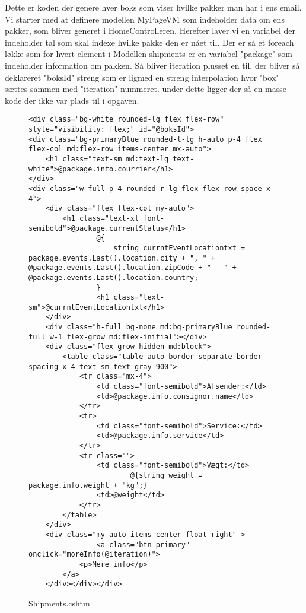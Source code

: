 Dette er koden der genere hver boks som viser hvilke pakker man har i ens email. Vi starter med at 
definere modellen MyPageVM som indeholder data om ens pakker, som bliver generet i HomeControlleren.
Herefter laver vi en variabel der indeholder tal som skal indexe hvilke pakke den er nået til. Der er så 
et foreach løkke som for hvert element i Modellen shipments er en variabel "package" som indeholder information
om pakken. Så bliver iteration plusset en til. der bliver så deklareret "boksId" streng som er ligmed en streng interpolation
hvor "box" sættes sammen med "iteration" nummeret. under dette ligger der så en masse kode der ikke var plads til i opgaven.
\newpage
\begin{figure}[!h]
    \begin{verbatim}
<div class="bg-white rounded-lg flex flex-row" style="visibility: flex;" id="@boksId">
<div class="bg-primaryBlue rounded-l-lg h-auto p-4 flex flex-col md:flex-row items-center mx-auto">
    <h1 class="text-sm md:text-lg text-white">@package.info.courrier</h1>
</div>
<div class="w-full p-4 rounded-r-lg flex flex-row space-x-4">
    <div class="flex flex-col my-auto">
        <h1 class="text-xl font-semibold">@package.currentStatus</h1>
                @{
                    string currntEventLocationtxt = package.events.Last().location.city + ", " + @package.events.Last().location.zipCode + " - " + @package.events.Last().location.country;
                }
                <h1 class="text-sm">@currntEventLocationtxt</h1>
    </div>
    <div class="h-full bg-none md:bg-primaryBlue rounded-full w-1 flex-grow md:flex-initial"></div>
    <div class="flex-grow hidden md:block">
        <table class="table-auto border-separate border-spacing-x-4 text-sm text-gray-900">
            <tr class="mx-4">
                <td class="font-semibold">Afsender:</td>
                <td>@package.info.consignor.name</td>
            </tr>
            <tr>
                <td class="font-semibold">Service:</td>
                <td>@package.info.service</td>
            </tr>
            <tr class="">
                <td class="font-semibold">Vægt:</td>
                        @{string weight = package.info.weight + "kg";}
                <td>@weight</td>
            </tr>
        </table>
    </div>
    <div class="my-auto items-center float-right" >
                <a class="btn-primary" onclick="moreInfo(@iteration)">
            <p>Mere info</p>
        </a>
    </div></div></div>
\end{verbatim}
\caption{Shipments.cshtml}
\label{code:Shipments.cs}
\end{figure}

